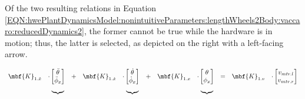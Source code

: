 \documentclass[crop=false,float=true,class=scrreprt]{standalone}
\begin{document}
\vspace{-0em}

Of the two resulting relations in Equation~%
\eqref{EQN:hwePlantDynamicsModel:nonintuitiveParameters:lengthWheels2Body:vaccaro:reducedDynamics2},
the former cannot be true while the hardware is in motion;
thus, the latter is selected, as depicted on the right with a left-facing arrow.




\clearpage



\begin{landscape}

\vspace*{\fill}

\begin{equation}
\label{EQN:hwePlantDynamicsModel:nonintuitiveParameters:lengthWheels2Body:vaccaro:reducedDynamics1}
\begin{array}{ccccccccccc}
\mbf{K}_{1.\ddot{x}}
& \cdot 
\begin{bmatrix}
\ddot{\theta}  \\
\ddot{\phi}_{x}\\
\end{bmatrix}
& + &
\mbf{K}_{1.\dot{x}}
& \cdot 
\begin{bmatrix}
\dot{\theta}  \\
\dot{\phi}_{x}\\
\end{bmatrix}
& + &
\mbf{K}_{1.x}
& \cdot 
\begin{bmatrix}
\theta  \\
\phi_{x}\\
\end{bmatrix}
& = &
\mbf{K}_{1.v}
& \cdot
\begin{bmatrix}
v_{mtr.l}\\
v_{mtr.r}\\
\end{bmatrix}
\\[-0em]
&
\hphantom{\cdot}
\underbrace{
\hphantom{
\begin{bmatrix}
\ddot{\phi}_{x}\\
\end{bmatrix}
}
}_{}
&&&
\hphantom{\cdot}
\underbrace{
\hphantom{
\begin{bmatrix}
\ddot{\phi}_{x}\\
\end{bmatrix}
}
}_{}
&&&
\hphantom{\cdot}
\underbrace{
\hphantom{
\begin{bmatrix}
\ddot{\phi}_{x}\\

\end{bmatrix}}}
\end{array}
\end{equation}
\end{landscape}
\end{document}
